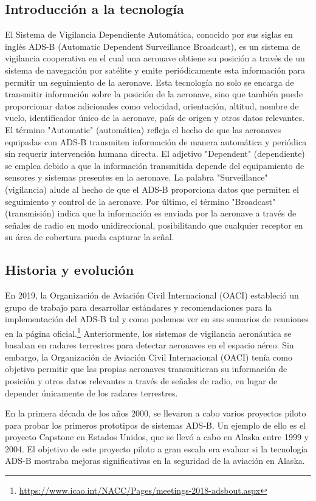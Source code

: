 \documentclass[a4paper, 11pt]{book}
\begin{document}
\subsection{Introducción a la tecnología}
El Sistema de Vigilancia Dependiente Automática, conocido por sus siglas en inglés ADS-B (Automatic Dependent Surveillance Broadcast), es un sistema de vigilancia cooperativa en el cual una aeronave obtiene su posición a través de un sistema de navegación por satélite y emite periódicamente esta información para permitir un seguimiento de la aeronave.
Esta tecnología no solo se encarga de transmitir información sobre la posición de la aeronave, sino que también puede proporcionar datos adicionales como velocidad, orientación, altitud, nombre de vuelo, identificador único de la aeronave, país de origen y otros datos relevantes.
El término "Automatic" (automática) refleja el hecho de que las aeronaves equipadas con ADS-B transmiten información de manera automática y periódica sin requerir intervención humana directa.
El adjetivo "Dependent" (dependiente) se emplea debido a que la información transmitida depende del equipamiento de sensores y sistemas presentes en la aeronave.
La palabra "Surveillance" (vigilancia) alude al hecho de que el ADS-B proporciona datos que permiten el seguimiento y control de la aeronave.
Por último, el término "Broadcast" (transmisión) indica que la información es enviada por la aeronave a través de señales de radio en modo unidireccional, posibilitando que cualquier receptor en su área de cobertura pueda capturar la señal.
\subsection{Historia y evolución}
En 2019, la Organización de Aviación Civil Internacional (OACI) estableció un grupo de trabajo para desarrollar estándares y recomendaciones para la implementación del ADS-B tal y como podemos ver en sus sumarios de reuniones en la página oficial.\footnote{\url{https://www.icao.int/NACC/Pages/meetings-2018-adsbout.aspx}}
Anteriormente, los sistemas de vigilancia aeronáutica se basaban en radares terrestres para detectar aeronaves en el espacio aéreo. Sin embargo, la Organización de Aviación Civil Internacional (OACI) tenía como objetivo permitir que las propias aeronaves transmitieran su información de posición y otros datos relevantes a través de señales de radio, en lugar de depender únicamente de los radares terrestres.

En la primera década de los años 2000, se llevaron a cabo varios proyectos piloto para probar los primeros prototipos de sistemas ADS-B. Un ejemplo de ello es el proyecto Capstone en Estados Unidos, que se llevó a cabo en Alaska entre 1999 y 2004. El objetivo de este proyecto piloto a gran escala era evaluar si la tecnología ADS-B mostraba mejoras significativas en la seguridad de la aviación en Alaska.
\end{document}
